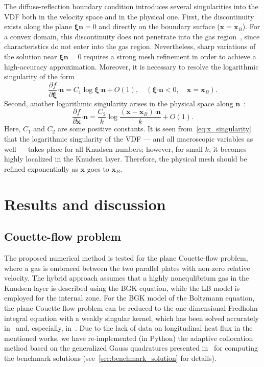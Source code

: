 \documentclass{elsarticle} %
\newcommand{\pder}[2][]{\frac{\partial#1}{\partial#2}}
\newcommand{\OO}[1]{O(#1)}
\newcommand{\bxi}{\boldsymbol{\xi}}
\newcommand{\bn}{\boldsymbol{n}}
\newcommand{\bdot}{\boldsymbol{\cdot}}
\newcommand{\bx}{\boldsymbol{x}}
\begin{document}
The diffuse-reflection boundary condition introduces several singularities into the VDF
both in the velocity space and in the physical one.
First, the discontinuity exists along the plane \(\bxi\bn=0\) and directly on the boundary surface (\(\bx=\bx_B\)).
For a convex domain, this discontinuity does not penetrate into the gas region~\cite{Kim2011, Guo2017},
since characteristics do not enter into the gas region.
Nevertheless, sharp variations of the solution near \(\bxi\bn=0\) requires a strong mesh refinement
in order to achieve a high-accuracy approximation.
Moreover, it is necessary to resolve the logarithmic singularity of the form~\cite{Takata2016}
\begin{equation}\label{eq:xi_singularity}
    \pder[f]{\bxi}\bdot\bn = C_1\log\bxi\bdot\bn + \OO{1}, \quad (\bxi\bdot\bn<0, \quad \bx=\bx_B).
\end{equation}
Second, another logarithmic singularity arises in the physical space along \(\bn\)~\cite{Takata2014}:
\begin{equation}\label{eq:x_singularity}
    \pder[f]{\bx}\bdot\bn = \frac{C_2}{k}\log\frac{(\bx-\bx_B)\bdot\bn}{k} + \OO{1}.
\end{equation}
Here, \(C_1\) and \(C_2\) are some positive constants.
It is seen from~\eqref{eq:x_singularity} that the logarithmic singularity of the VDF
--- and all macroscopic variables as well --- takes place for all Knudsen numbers;
however, for small \(k\), it becomes highly localized in the Knudsen layer.
Therefore, the physical mesh should be refined exponentially as \(\bx\) goes to \(\bx_B\).

\section{Results and discussion}\label{sec:results}

\subsection{Couette-flow problem}

The proposed numerical method is tested for the plane Couette-flow problem,
where a gas is embraced between the two parallel plates with non-zero relative velocity.
The hybrid approach assumes that a highly nonequlibrium gas in the Knudsen layer
is described using the BGK equation, while the LB model is employed for the internal zone.
For the BGK model of the Boltzmann equation, the plane Couette-flow problem can be reduced
to the one-dimensional Fredholm integral equation with a weakly singular kernel,
which has been solved accurately in~\cite{Luo2015} and, especially, in~\cite{Luo2016}.
Due to the lack of data on longitudinal heat flux in the mentioned works, we have re-implemented (in Python)
the adaptive collocation method based on the generalized Gauss quadratures presented in~\cite{Luo2016}
for computing the benchmark solutions (see~\ref{sec:benchmark_solution} for details).
\end{document}
